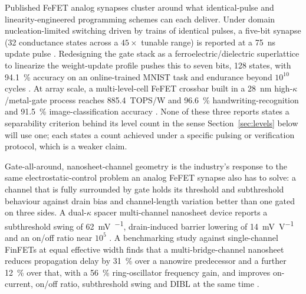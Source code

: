 Published FeFET analog synapses cluster around what identical-pulse and
linearity-engineered programming schemes can each deliver. Under domain
nucleation-limited switching driven by trains of identical pulses, a five-bit synapse
(32 conductance states across a $45\times$ tunable range) is reported at a
\SI{75}{\nano\second} update pulse \cite{Jerry2017_IEDM}. Redesigning the gate stack as a
ferroelectric/dielectric superlattice to linearize the weight-update profile pushes this
to seven bits, 128 states, with \SI{94.1}{\percent} accuracy on an online-trained MNIST
task and endurance beyond $10^{10}$ cycles \cite{Aabrar2022_TED}. At array scale, a
multi-level-cell FeFET crossbar built in a 28~nm high-$\kappa$/metal-gate process reaches
\num{885.4}~TOPS/W and \SI{96.6}{\percent} handwriting-recognition and
\SI{91.5}{\percent} image-classification accuracy \cite{Soliman2023_NatComm}. None of
these three reports states a separability criterion behind its level count in the sense
Section~\ref{sec:levels} below will use one; each states a count achieved under a
specific pulsing or verification protocol, which is a weaker claim.

Gate-all-around, nanosheet-channel geometry is the industry's response to the same
electrostatic-control problem an analog FeFET synapse also has to solve: a channel that
is fully surrounded by gate holds its threshold and subthreshold behaviour against drain
bias and channel-length variation better than one gated on three sides. A dual-$\kappa$
spacer multi-channel nanosheet device reports a subthreshold swing of
\SI{62}{\milli\volt\per{}}, drain-induced barrier lowering of
\SI{14}{\milli\volt\per\volt} and an on/off ratio near $10^5$
\cite{Panigrahy2024_IEEEAccess}. A benchmarking study against single-channel FinFETs
at equal effective width finds that a multi-bridge-channel nanosheet reduces propagation
delay by \SI{31}{\percent} over a nanowire predecessor and a further \SI{12}{\percent}
over that, with a \SI{56}{\percent} ring-oscillator frequency gain, and improves
on-current, on/off ratio, subthreshold swing and DIBL at the same time
\cite{Sreenivasulu2024_IEEEAccess}.


